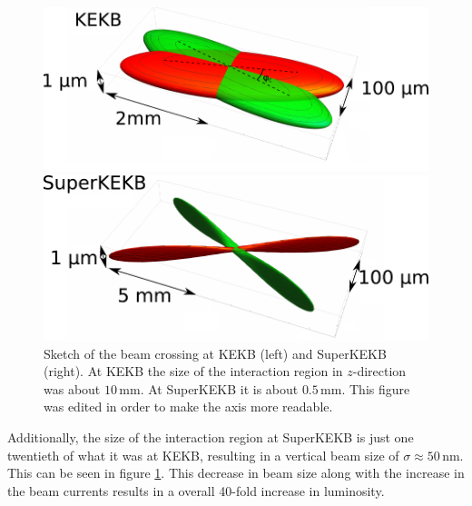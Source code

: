 \documentclass[a4paper,11pt,twosided,final,german,openbib,pdftex,listof=totoc,bibliography=totoc]{scrbook}
\begin{document}
\begin{figure}[h!]
	\centering
	\begin{minipage}[b]{0.45\linewidth}
		\centering
		\includegraphics[width=\textwidth]{Bilder/BeamBelle}
	\end{minipage}
	\hspace{0.5cm}
	\begin{minipage}[b]{0.45\linewidth}
		\centering
		\includegraphics[width=\textwidth]{Bilder/SuperKEKBBeam}
	\end{minipage}
		\caption[Sketch Of The Beam Crossing For KEKB And SuperKEKB]{Sketch of the beam crossing at KEKB (left) and SuperKEKB (right). At KEKB the size of the interaction region in $z$-direction was about $10\,\textrm{mm}$. At SuperKEKB it is about $0.5\,\textrm{mm}$.\cite{Beamsize} This figure was edited in order to make the axis more readable.}
	\label{fig:beamsize}

\end{figure}







Additionally, the size of the interaction region at SuperKEKB is just one twentieth of what it was at KEKB, resulting in a vertical beam size of $\sigma \approx 50\,\textrm{nm} $. This can be seen in figure \ref{fig:beamsize}. This decrease in beam size along with the increase in the beam currents  results in a overall 40-fold increase in luminosity.  \cite{B2TR} \cite{B2B}
\end{document}
